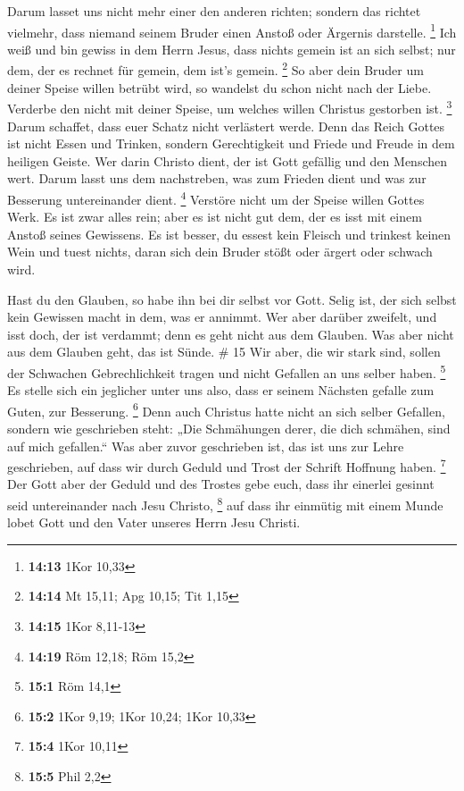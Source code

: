  Darum lasset uns nicht mehr einer den anderen richten;
sondern das richtet vielmehr, dass niemand seinem Bruder einen Anstoß
oder Ärgernis darstelle. \footnote{\textbf{14:13} 1Kor 10,33}
 Ich weiß und bin gewiss in dem Herrn Jesus, dass nichts
gemein ist an sich selbst; nur dem, der es rechnet für gemein, dem ist's
gemein. \footnote{\textbf{14:14} Mt 15,11; Apg 10,15; Tit 1,15}
 So aber dein Bruder um deiner Speise willen betrübt wird,
so wandelst du schon nicht nach der Liebe. Verderbe den nicht mit deiner
Speise, um welches willen Christus gestorben ist. \footnote{\textbf{14:15}
  1Kor 8,11-13}  Darum schaffet, dass euer Schatz nicht
verlästert werde.  Denn das Reich Gottes ist nicht Essen
und Trinken, sondern Gerechtigkeit und Friede und Freude in dem heiligen
Geiste.  Wer darin Christo dient, der ist Gott gefällig und
den Menschen wert.  Darum lasst uns dem nachstreben, was
zum Frieden dient und was zur Besserung untereinander dient. \footnote{\textbf{14:19}
  Röm 12,18; Röm 15,2}  Verstöre nicht um der Speise willen
Gottes Werk. Es ist zwar alles rein; aber es ist nicht gut dem, der es
isst mit einem Anstoß seines Gewissens.  Es ist besser, du
essest kein Fleisch und trinkest keinen Wein und tuest nichts, daran
sich dein Bruder stößt oder ärgert oder schwach wird.

 Hast du den Glauben, so habe ihn bei dir selbst vor Gott.
Selig ist, der sich selbst kein Gewissen macht in dem, was er annimmt.
 Wer aber darüber zweifelt, und isst doch, der ist
verdammt; denn es geht nicht aus dem Glauben. Was aber nicht aus dem
Glauben geht, das ist Sünde. \# 15  Wir aber, die wir stark
sind, sollen der Schwachen Gebrechlichkeit tragen und nicht Gefallen an
uns selber haben. \footnote{\textbf{15:1} Röm 14,1}  Es
stelle sich ein jeglicher unter uns also, dass er seinem Nächsten
gefalle zum Guten, zur Besserung. \footnote{\textbf{15:2} 1Kor 9,19;
  1Kor 10,24; 1Kor 10,33}  Denn auch Christus hatte nicht an
sich selber Gefallen, sondern wie geschrieben steht: „Die Schmähungen
derer, die dich schmähen, sind auf mich gefallen.``  Was
aber zuvor geschrieben ist, das ist uns zur Lehre geschrieben, auf dass
wir durch Geduld und Trost der Schrift Hoffnung haben. \footnote{\textbf{15:4}
  1Kor 10,11}  Der Gott aber der Geduld und des Trostes gebe
euch, dass ihr einerlei gesinnt seid untereinander nach Jesu Christo,
\footnote{\textbf{15:5} Phil 2,2}  auf dass ihr einmütig mit
einem Munde lobet Gott und den Vater unseres Herrn Jesu Christi.

